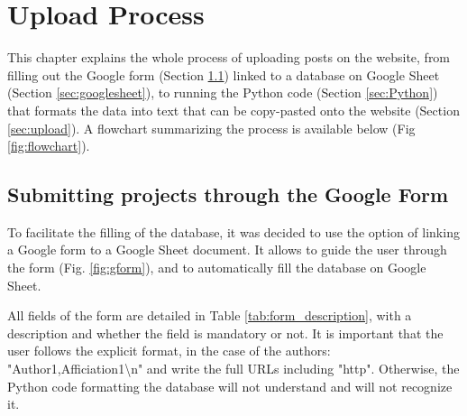 \chapter{Upload Process}\label{chap:process}

This chapter explains the whole process of uploading posts on the website, from filling out the Google form (Section \ref{sec:googleform}) linked to a database on Google Sheet (Section \ref{sec:googlesheet}), to running the Python code (Section \ref{sec:Python}) that formats the data into text that can be copy-pasted onto the website (Section \ref{sec:upload}). A flowchart summarizing the process is available below (Fig \ref{fig:flowchart}).

\begin{landscape}
\end{landscape}

\section{Submitting projects through the Google Form}\label{sec:googleform}

To facilitate the filling of the database, it was decided to use the option of linking a Google form to a Google Sheet document. It allows to guide the user through the form (Fig. \ref{fig:gform}), and to automatically fill the database on Google Sheet.

All fields of the form are detailed in Table \ref{tab:form_description}, with a description and whether the field is mandatory or not. It is important that the user follows the explicit format, in the case of the authors: "Author1,Afficiation1\textbackslash n" and write the full URLs including "http". Otherwise, the Python code formatting the database will not understand and will not recognize it. 

